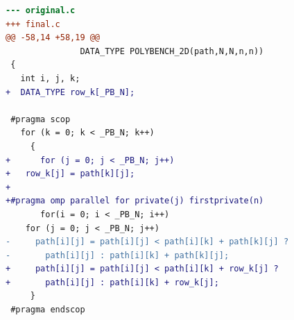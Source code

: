 \begin{lstlisting}[language=diff,basicstyle=\ttfamily\scriptsize,breaklines=true,caption={polybench/floyd-warshall — FASTER (e10)}]
--- original.c
+++ final.c
@@ -58,14 +58,19 @@
 			   DATA_TYPE POLYBENCH_2D(path,N,N,n,n))
 {
   int i, j, k;
+  DATA_TYPE row_k[_PB_N];
 
 #pragma scop
   for (k = 0; k < _PB_N; k++)
     {
+      for (j = 0; j < _PB_N; j++)
+	row_k[j] = path[k][j];
+
+#pragma omp parallel for private(j) firstprivate(n)
       for(i = 0; i < _PB_N; i++)
 	for (j = 0; j < _PB_N; j++)
-	  path[i][j] = path[i][j] < path[i][k] + path[k][j] ?
-	    path[i][j] : path[i][k] + path[k][j];
+	  path[i][j] = path[i][j] < path[i][k] + row_k[j] ?
+	    path[i][j] : path[i][k] + row_k[j];
     }
 #pragma endscop
 
\end{lstlisting}
